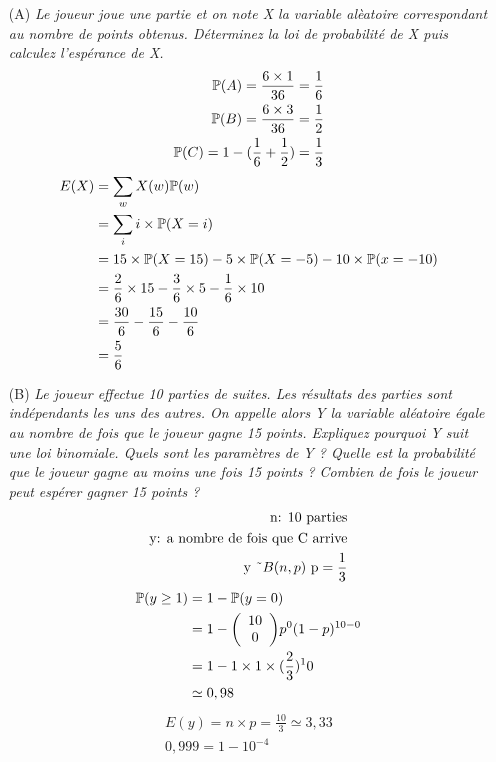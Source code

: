 \begin{itemize}
    \item[(A)]  \textit{Le joueur joue une partie et on note X la variable alèatoire correspondant au nombre de points obtenus.
Déterminez la loi de probabilité de X puis calculez l’espérance de X.}
\begin{align*}
    \mathbb{P}(A) = \frac{6 \times1}{36} = \frac{1}{6}\\
    \mathbb{P}(B) = \frac{6 \times3}{36} = \frac{1}{2}\\
    \mathbb{P}(C) = 1 - (\frac{1}{6}+ \frac{1}{2}) = \frac{1}{3} \\
\end{align*}
\begin{align*}
    E(X) &= \sum_{w}X(w)\mathbb{P}(w)\\
    &= \sum_{i}i \times \mathbb{P}(X = i) \\
    &= 15 \times \mathbb{P}(X=15) -5 \times \mathbb{P}(X =-5) -10 \times \mathbb{P}(x=-10)\\
    &= \frac{2}{6}\times15 - \frac{3}{6}\times 5 - \frac{1}{6}\times 10\\
    &= \frac{30}{6} - \frac{15}{6} - \frac{10}{6}\\
    &= \frac{5}{6}
\end{align*}
    \item[(B)]  \textit{Le joueur effectue 10 parties de suites. Les résultats des parties sont indépendants les uns des autres. On appelle alors Y la variable aléatoire égale au nombre de fois que le joueur gagne 15 points.
Expliquez pourquoi Y suit une loi binomiale. Quels sont les paramètres de Y ?
Quelle est la probabilité que le joueur gagne au moins une fois 15 points ?
Combien de fois le joueur peut espérer gagner 15
points ?}
\begin{align*}
    \text{n: 10 parties}\\
    \text{y: a nombre de fois que C arrive}\\
    \text{y \~{}} B(n,p) \text{  p} = \frac{1}{3}
\end{align*}
\begin{align*}
    \mathbb{P} (y \geq 1) &= 1 - \mathbb{P}(y = 0)\\
    &= 1 - {\left( \begin{array}{cc}10 \\ 0\end{array} \right)}p^0(1-p)^{10-0}\\
    &=1-1\times1\times(\frac{2}{3})^10\\
    &\simeq 0,98
\end{align*}
\begin{align*}
    E(y) = n\times p = \frac{10}{3} \simeq 3,33\\
    0,999 = 1 - 10^{-4}
\end{align*}


\end{itemize}
